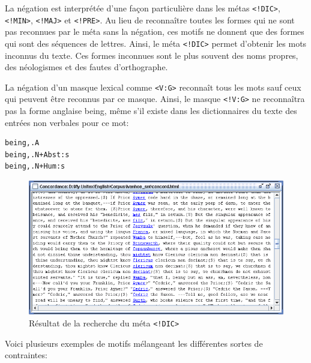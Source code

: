 \bigskip
\noindent La négation est interprétée d’une façon particulière dans les métas 
\verb+<!DIC>+, \verb+<!MIN>+, \verb+<!MAJ>+ et \verb+<!PRE>+.
Au lieu de reconnaître toutes les formes qui ne sont pas reconnues
par le méta sans la négation, ces motifs ne donnent que des formes qui sont des séquences
de lettres. Ainsi, le méta \verb+<!DIC>+ permet d’obtenir les mots inconnus du texte. Ces formes
inconnues sont le plus souvent des noms propres, des néologismes et des fautes d’orthographe.


\bigskip
\noindent La négation d’un masque lexical comme  \verb+<V:G>+ reconnaît tous les mots sauf ceux qui
peuvent être reconnus par ce masque. Ainsi, le masque \verb+<!V:G>+ ne reconnaîtra pas la forme
anglaise being, même s’il existe dans les dictionnaires du texte des entrées non verbales pour ce
mot:



\begin{verbatim}
being,.A
being,.N+Abst:s
being,.N+Hum:s
\end{verbatim}

\bigskip
\begin{figure}[h]
\begin{center}
\includegraphics[width=15cm]{resources/img/fig4-1.png}
\caption{Résultat de la recherche du méta \texttt{<!DIC>}}
\end{center}
\end{figure}

\bigskip
\noindent Voici plusieurs exemples de motifs mélangeant les différentes sortes de contraintes:

